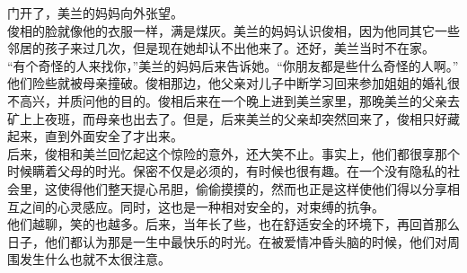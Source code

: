 门开了，美兰的妈妈向外张望。\\

俊相的脸就像他的衣服一样，满是煤灰。美兰的妈妈认识俊相，因为他同其它一些邻居的孩子来过几次，但是现在她却认不出他来了。还好，美兰当时不在家。\\

“有个奇怪的人来找你，”美兰的妈妈后来告诉她。“你朋友都是些什么奇怪的人啊。”\\

他们险些就被母亲撞破。俊相那边，他父亲对儿子中断学习回来参加姐姐的婚礼很不高兴，并质问他的目的。俊相后来在一个晚上进到美兰家里，那晚美兰的父亲去矿上上夜班，而母亲也出去了。但是，后来美兰的父亲却突然回来了，俊相只好藏起来，直到外面安全了才出来。\\

后来，俊相和美兰回忆起这个惊险的意外，还大笑不止。事实上，他们都很享那个时候瞒着父母的时光。保密不仅是必须的，有时候也很有趣。在一个没有隐私的社会里，这使得他们整天提心吊胆，偷偷摸摸的，然而也正是这样使他们得以分享相互之间的心灵感应。同时，这也是一种相对安全的，对束缚的抗争。\\

他们越聊，笑的也越多。后来，当年长了些，也在舒适安全的环境下，再回首那么日子，他们都认为那是一生中最快乐的时光。在被爱情冲昏头脑的时候，他们对周围发生什么也就不太很注意。\\
